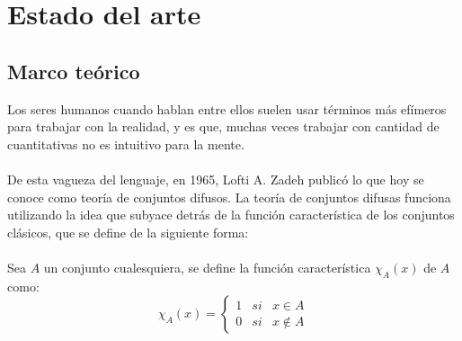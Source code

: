 \chapter{Estado del arte}

\section{Marco teórico}
Los seres humanos cuando hablan entre ellos suelen usar términos más efímeros para trabajar con la realidad, y es que, muchas veces trabajar con cantidad de cuantitativas no es intuitivo para la mente. \\ \\
De esta vagueza del lenguaje, en 1965, Lofti A. Zadeh publicó lo que hoy se conoce como teoría de conjuntos difusos. La teoría de conjuntos difusas funciona utilizando la idea que subyace detrás de la función característica de los conjuntos clásicos, que se define de la siguiente forma: \\ \\
Sea $A$ un conjunto cualesquiera, se define la función característica $\chi_A(x)$ de $A$ como:
\[
	\chi_A(x) = \left\{
		\begin{array}{ccc}
			1 & si & x \in A \\
			0 & si & x \notin A
		\end{array}
	\right.
\]

